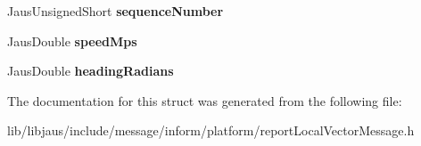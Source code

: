 \begin{DoxyCompactItemize}
\item 
\hypertarget{struct_report_local_vector_message_struct_a2a1d3404530aa5389624fc33a9fb1cec}{\-Jaus\-Unsigned\-Short {\bfseries sequence\-Number}}\label{struct_report_local_vector_message_struct_a2a1d3404530aa5389624fc33a9fb1cec}

\item 
\hypertarget{struct_report_local_vector_message_struct_acc5bdb86fc327ec70449318331bc53d7}{\-Jaus\-Double {\bfseries speed\-Mps}}\label{struct_report_local_vector_message_struct_acc5bdb86fc327ec70449318331bc53d7}

\item 
\hypertarget{struct_report_local_vector_message_struct_a29dab930e02225255ca41dbf0f29b77f}{\-Jaus\-Double {\bfseries heading\-Radians}}\label{struct_report_local_vector_message_struct_a29dab930e02225255ca41dbf0f29b77f}

\end{DoxyCompactItemize}


\-The documentation for this struct was generated from the following file\-:\begin{DoxyCompactItemize}
\item 
lib/libjaus/include/message/inform/platform/report\-Local\-Vector\-Message.\-h\end{DoxyCompactItemize}
